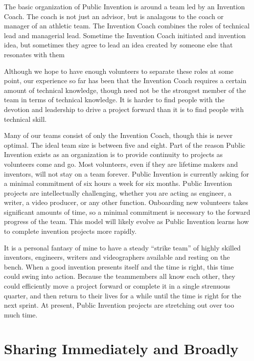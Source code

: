 \documentclass[
	fontsize=10pt, %
	twoside=false, %
	secnumdepth=1, %
]{kaobook}
\begin{document}
The basic organization of Public Invention is around
a team led by an Invention Coach.
The coach is not just an advisor, but
is analagous to the coach or manager of an athletic team.
The Invention Coach combines the roles of technical lead
and managerial lead.
Sometime the Invention Coach initiated and invention idea,
but sometimes they agree to lead an idea created by someone else that resonates
with them

Although we hope to have enough volunteers to separate these
roles at some point, our experience so far has been that
the Invention Coach requires a certain amount of technical
knowledge, though need not be the strongest member of the
team in terms of technical knowledge.
It is harder to find people with the devotion and leadership
to drive a project forward than it is to find people with
technical skill.

Many of our teams consist of only the Invention Coach,
though this is never optimal.
The ideal team size is between five and eight.
Part of the reason Public Invention exists as an
organization is to provide continuity to projects as
volunteers come and go.
Most volunteers, even if they are lifetime makers and
inventors, will not stay on a team forever.
Public Invention is currently asking for a minimal commitment of six hours a week
for six months.
Public Invention projects are intellectually challenging,
whether you are acting as engineer, a writer, a video producer,
or any other function.
Onboarding new volunteers takes significant amounts of time,
so a minimal commitment is necessary to the forward progress of the team.
This model will likely evolve as Public Invention learns
how to complete invention projects more rapidly.

It is a personal fantasy of mine to have a steady ``strike team'' of
highly skilled inventors, engineers, writers and videographers
available and resting on the bench.
When a good invention presents itself and the time is right,
this time could swing into action.
Because the teammembers all know each other, they could
efficiently move a project forward or complete it in a single strenuous quarter,
and then return to their lives for a while until the time
is right for the next sprint.
At present, Public Invention projects are stretching out over too much time.

\section{Sharing Immediately and Broadly}
\end{document}
